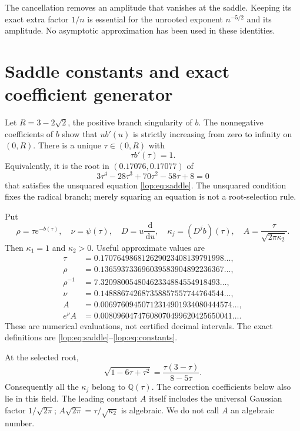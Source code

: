\documentclass[11pt,letterpaper]{article}
\numberwithin{equation}{section}
\theoremstyle{remark}\newtheorem{remark}[theorem]{Remark}
\newcommand{\dd}{\,\mathrm d}
\newcommand{\QQ}{\mathbb Q}
\begin{document}
The cancellation removes an amplitude that vanishes at the saddle.
Keeping its exact extra factor $1/n$ is essential for the unrooted
exponent $n^{-5/2}$ and its amplitude. No asymptotic approximation has
been used in these identities.

\section{Saddle constants and exact coefficient generator}\label{lop:sec:generator}

Let $R=3-2\sqrt2$, the positive branch singularity of $b$.
The nonnegative coefficients of $b$ show that $ub'(u)$ is strictly
increasing from zero to infinity on $(0,R)$. There is a unique
$\tau\in(0,R)$ with
\begin{equation}\label{lop:eq:saddle}
 \tau b'(\tau)=1.
\end{equation}
Equivalently, it is the root in $(0.17076,0.17077)$ of
\begin{equation}\label{lop:eq:quartic}
 3\tau^4-28\tau^3+70\tau^2-58\tau+8=0
\end{equation}
that satisfies the unsquared equation \eqref{lop:eq:saddle}. The unsquared
condition fixes the radical branch; merely squaring an equation is not
a root-selection rule.

Put
\begin{equation}\label{lop:eq:constants}
 \rho=\tau e^{-b(\tau)},\quad \nu=\psi(\tau),\quad
 D=u\frac{\dd}{\dd u},\quad \kappa_j=(D^jb)(\tau),\quad
 A=\frac{\tau}{\sqrt{2\pi\kappa_2}}.
\end{equation}
Then $\kappa_1=1$ and $\kappa_2>0$. Useful approximate values are
\[
\begin{aligned}
 \tau&=0.170764986812629023408139791998\ldots,\\
 \rho&=0.136593733696039583904892236367\ldots,\\
 \rho^{-1}&=7.32098005480462334884554918493\ldots,\\
 \nu&=0.148886742687358857557744764544\ldots,\\
 A&=0.00697609450712314901934080444574\ldots,\\
 e^\nu A&=0.00809604747608070499620425650041\ldots.
\end{aligned}
\]
These are numerical evaluations, not certified decimal intervals.
The exact definitions are \eqref{lop:eq:saddle}--\eqref{lop:eq:constants}.

At the selected root,
\[
 \sqrt{1-6\tau+\tau^2}=\frac{\tau(3-\tau)}{8-5\tau}.
\]
Consequently all the $\kappa_j$ belong to $\QQ(\tau)$. The correction
coefficients below also lie in this field. The leading constant $A$
itself includes the universal Gaussian factor $1/\sqrt{2\pi}$;
$A\sqrt{2\pi}=\tau/\sqrt{\kappa_2}$ is algebraic. We do not call $A$
an algebraic number.
\end{document}
